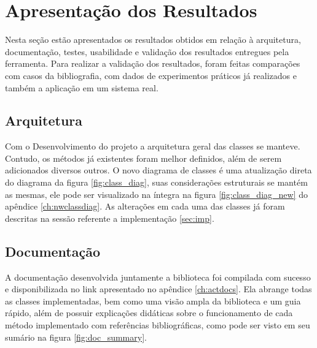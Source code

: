 \chapter{Apresentação dos Resultados}

Nesta seção estão apresentados os resultados obtidos em relação à arquitetura, documentação, testes, usabilidade e
validação dos resultados entregues pela ferramenta.
Para realizar a validação dos resultados, foram feitas comparações com casos da bibliografia, com dados de experimentos
práticos já realizados e também a aplicação em um sistema real.


\section{Arquitetura}
Com o Desenvolvimento do projeto a arquitetura geral das classes se manteve.
Contudo, os métodos já existentes foram melhor definidos, além de serem adicionados diversos outros.
O novo diagrama de classes é uma atualização direta do diagrama da figura \ref{fig:class_diag}, suas considerações
estruturais se mantém as mesmas, ele pode ser visualizado na íntegra na figura \ref{fig:class_diag_new}
do apêndice \ref{ch:nwclassdiag}.
As alterações em cada uma das classes já foram descritas na sessão referente a implementação \ref{sec:imp}.


\section{Documentação}

A documentação desenvolvida juntamente a biblioteca foi compilada com sucesso e disponibilizada no link apresentado
no apêndice \ref{ch:actdocs}.
Ela abrange todas as classes implementadas, bem como uma visão ampla da biblioteca e um guia rápido, além de possuir
explicações didáticas sobre o funcionamento de cada método implementado com referências bibliográficas, como pode ser
visto em seu sumário na figura \ref{fig:doc_summary}.

